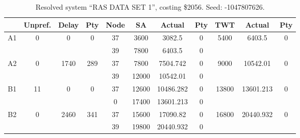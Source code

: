 \begin{sidewaystable}
\footnotesize
\caption{Resolved system ``RAS DATA SET 1'', costing \$2056. Seed: -1047807626.}
\centering
\begin{tabular}{c||c|c|c||c|c|c|c||c|c|c}
  \hline \hline
  &
  Unpref. & 
  Delay &
  Pty &
  Node &
  SA &
  Actual &
  Pty &
  TWT &
  Actual &
  Pty \\
      \hline
      \multirow{2}{*}{A1} &
      \multirow{2}{*}{0} &
      \multirow{2}{*}{0} &
      \multirow{2}{*}{0} &
      37 &
      3600 &
        3082.5 &
        0 &
      \multirow{2}{*}{5400} &
        \multirow{2}{*}{6403.5} &
        \multirow{2}{*}{0}
      \\
      \cline{5-8}
       &
       &
       &
       &
      39 &
      7800 &
        6403.5 &
        0 &
      
         &
        
      \\
      \hline
      \multirow{2}{*}{A2} &
      \multirow{2}{*}{0} &
      \multirow{2}{*}{1740} &
      \multirow{2}{*}{289} &
      37 &
      7800 &
        7504.742 &
        0 &
      \multirow{2}{*}{9000} &
        \multirow{2}{*}{10542.01} &
        \multirow{2}{*}{0}
      \\
      \cline{5-8}
       &
       &
       &
       &
      39 &
      12000 &
        10542.01 &
        0 &
      
         &
        
      \\
      \hline
      \multirow{2}{*}{B1} &
      \multirow{2}{*}{11} &
      \multirow{2}{*}{0} &
      \multirow{2}{*}{0} &
      37 &
      12600 &
        10486.282 &
        0 &
      \multirow{2}{*}{13800} &
        \multirow{2}{*}{13601.213} &
        \multirow{2}{*}{0}
      \\
      \cline{5-8}
       &
       &
       &
       &
      0 &
      17400 &
        13601.213 &
        0 &
      
         &
        
      \\
      \hline
      \multirow{2}{*}{B2} &
      \multirow{2}{*}{0} &
      \multirow{2}{*}{2460} &
      \multirow{2}{*}{341} &
      37 &
      15600 &
        17090.82 &
        0 &
      \multirow{2}{*}{16800} &
        \multirow{2}{*}{20440.932} &
        \multirow{2}{*}{0}
      \\
      \cline{5-8}
       &
       &
       &
       &
      39 &
      19800 &
        20440.932 &
        0 &
      

\end{tabular}
\end{sidewaystable}
